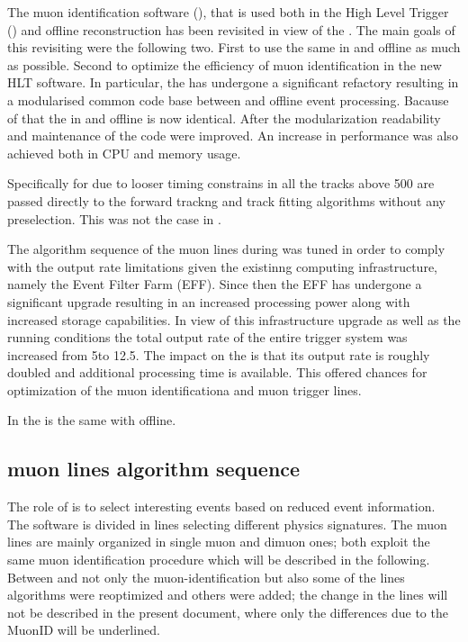 
The muon identification software \cite{LHCb-PUB-2009-013,LHCb-PUB-2010-002} (\muonID),
that is used both in the High Level Trigger (\hlt) \cite{LHCb-PUB-2011-017} and offline reconstruction has been
revisited in view of the \lhc \runtwo.
The main goals of this revisiting were the following two. First to use the same \muonID in \hlt and offline as much as possible.
Second to optimize the efficiency of muon identification in the new HLT software.
In particular, the \muonID has undergone a significant refactory resulting in a modularised common code base
between \hlt and offline event processing.
Bacause of that the \muonID in \hlt and offline is now identical. After the modularization readability and maintenance
of the code were improved.  An increase in performance was also achieved both in CPU and memory usage.

Specifically for \hltone due to looser timing constrains in \runtwo all the tracks above 500 \mevc
are passed directly to the forward trackng and track fitting algorithms without any preselection. This was not the
case in \runone.


The algorithm sequence of the \hltone muon lines during \runone was tuned in order to
comply with the output rate limitations given the existinng computing infrastructure,
namely the Event Filter Farm (EFF).
Since then the EFF has undergone a significant upgrade resulting in an increased processing
power along with increased storage capabilities.
In view of this infrastructure upgrade as well as the \runtwo \lhc running conditions
the total output rate of the entire trigger system was increased
from 5\khz to 12.5\khz.
The impact on the \hltone is that its output rate is roughly doubled and additional processing time is available.
This offered chances for optimization of the \hltone muon identificationa and muon trigger lines.

In  the \muonID is the same with offline.

\subsection{\hltone muon lines algorithm sequence}
\label{sec:hlt1run2}

The role of \hltone is to select interesting events based on reduced event information.
The software is divided in lines selecting different physics signatures.
The \hltone muon lines are mainly organized in single muon and dimuon ones; both
exploit the same muon identification procedure which will be described in the following.
Between \runone and \runtwo not only the muon-identification but also some of the lines algorithms were
reoptimized and others were added; the change in the lines will not be described in the present document,
where only the differences due to the MuonID will be underlined.


